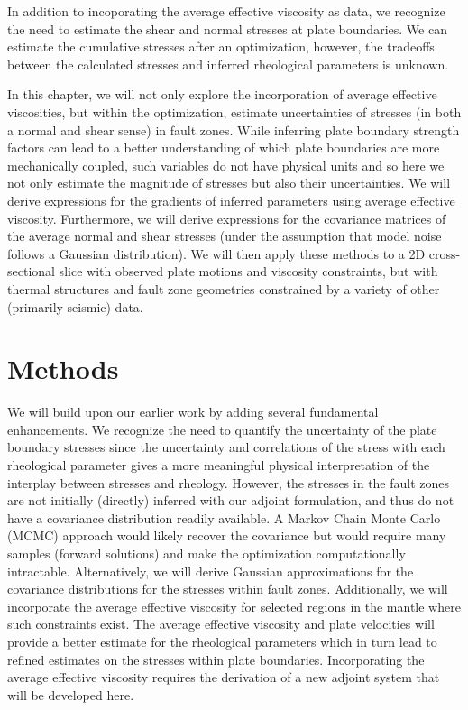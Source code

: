 \documentclass[12pt]{article}
\begin{document}
In addition to incoporating the average effective viscosity as data, we recognize the need to estimate the shear and normal stresses at plate boundaries. We can estimate the cumulative stresses after an optimization, however, the tradeoffs between the calculated stresses and inferred rheological parameters is unknown. 

 In this chapter, we will not only explore the incorporation of average effective viscosities, but within the optimization, estimate uncertainties of stresses (in both a normal and shear sense) in fault zones. While inferring plate boundary strength factors \citep{ratnaswamy2015adjoint} can lead to a better understanding of which plate boundaries are more mechanically coupled, such variables do not have physical units and so here we not only estimate the magnitude of  stresses but also their uncertainties. We will derive expressions for the gradients of inferred parameters using average effective viscosity. Furthermore, we will derive expressions for the covariance matrices of the average normal and shear stresses (under the assumption that model noise follows a Gaussian distribution). We will then apply these methods to a 2D cross-sectional slice with observed plate motions and viscosity constraints, but with thermal structures and fault zone geometries constrained by a variety of other (primarily seismic) data.
 


\section*{Methods}
We will build upon our earlier work \citep{ratnaswamy2015adjoint} by adding several fundamental enhancements. We recognize the need to quantify the uncertainty of the plate boundary stresses since the uncertainty and correlations of the stress with each rheological parameter gives a more meaningful physical interpretation of the interplay between stresses and rheology. However, the stresses in the fault zones are not initially (directly) inferred with our adjoint formulation, and thus do not have a covariance distribution readily available. A Markov Chain Monte Carlo (MCMC) approach would likely recover the covariance but would require many samples (forward solutions) and make the optimization computationally intractable. Alternatively, we will derive Gaussian approximations for the covariance distributions for the stresses within fault zones.
 Additionally, we will incorporate the average effective viscosity for selected regions in the mantle where such constraints exist. 
The average effective viscosity and plate velocities will provide a better estimate for the rheological parameters which in turn lead to refined estimates on the stresses within plate boundaries. Incorporating the average effective viscosity requires the derivation of a new adjoint system that will be developed here. 
\end{document}
